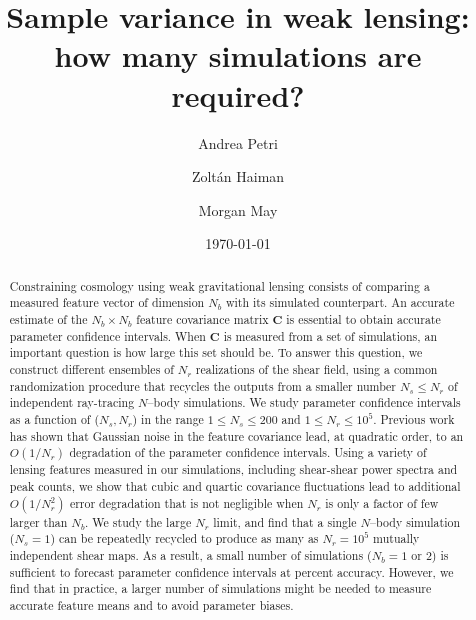 \documentclass[reprint,aps,prd,superscriptaddress,showkeys,showpacs]{revtex4-1}
\newcommand{\bb}[1]{\mathbf{#1}}
\begin{document}
\title{Sample variance in weak lensing: how many simulations are required?}

\author{Andrea Petri}

\author{Zolt\'an Haiman}

\author{Morgan May}

\date{\today}

\label{firstpage}

\begin{abstract}

Constraining cosmology using weak gravitational lensing consists of
comparing a measured feature vector of dimension $N_b$ with its
simulated counterpart. An accurate estimate of the $N_b\times N_b$
feature covariance matrix $\bb{C}$ is essential to obtain accurate
parameter confidence intervals. When $\bb{C}$ is measured from a set
of simulations, an important question is how large this set should
be. To answer this question, we construct different ensembles of $N_r$
realizations of the shear field, using a common randomization
procedure that recycles the outputs from a smaller number $N_s\leq
N_r$ of independent ray-tracing $N$--body simulations.  We study
parameter confidence intervals as a function of ($N_s,N_r$) in the
range $1\leq N_s\leq 200$ and $1\leq N_r\leq 10^5$.  Previous work
\citep{DodelsonSchneider13} has shown that Gaussian noise in the
feature covariance lead, at quadratic order, to an $O(1/N_r)$
degradation of the parameter confidence intervals. Using a variety of
lensing features measured in our simulations, including shear-shear
power spectra and peak counts, we show that cubic and quartic
covariance fluctuations lead to additional $O(1/N_r^2)$ error
degradation that is not negligible when $N_r$ is only a factor of few
larger than $N_b$. We study the large $N_r$ limit, and find that a
single $N$--body simulation ($N_s=1$) can be repeatedly recycled to
produce as many as $N_r=10^5$ mutually independent shear maps. As a
result, a small number of simulations ($N_b=1$ or $2$) is sufficient
to forecast parameter confidence intervals at percent
accuracy. However, we find that in practice, a larger number of
simulations might be needed to measure accurate feature means and to
avoid parameter biases.
\end{abstract}
\end{document}
